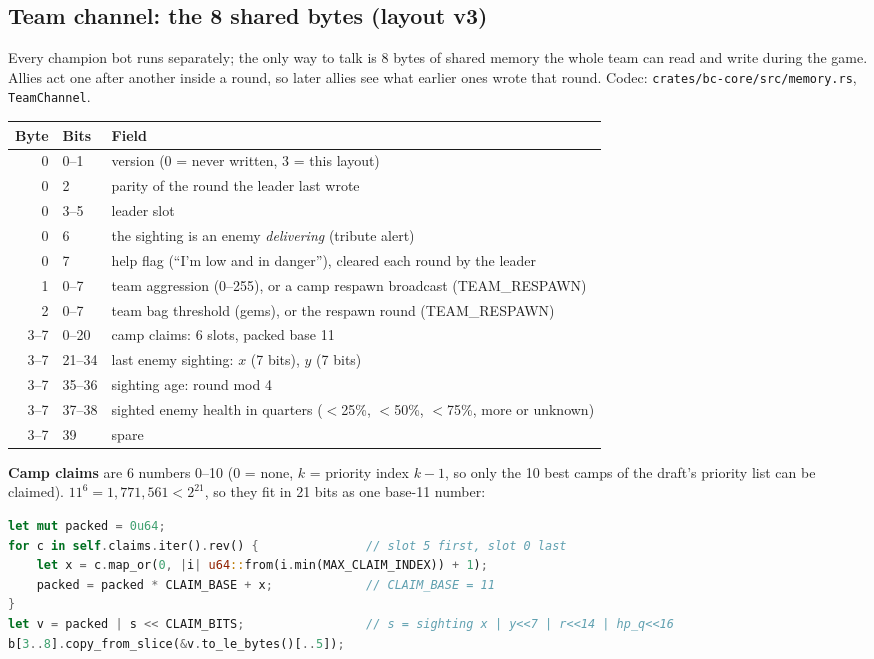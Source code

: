 \documentclass[11pt,a4paper]{article}
\newcommand{\f}[1]{\texttt{#1}}
\begin{document}
\subsection{Team channel: the 8 shared bytes (layout v3)}
Every champion bot runs separately; the only way to talk is 8 bytes of shared memory the whole team can read
and write during the game. Allies act one after another inside a round, so later allies see what earlier
ones wrote that round. Codec: \f{crates/bc-core/src/memory.rs}, \f{TeamChannel}.

\begin{center}\small
\begin{tabular}{@{}rll@{}}
\toprule
Byte & Bits & Field\\
\midrule
0 & 0--1 & version (0 = never written, 3 = this layout)\\
0 & 2 & parity of the round the leader last wrote\\
0 & 3--5 & leader slot\\
0 & 6 & the sighting is an enemy \emph{delivering} (tribute alert)\\
0 & 7 & help flag (``I'm low and in danger''), cleared each round by the leader\\
1 & 0--7 & team aggression (0--255), or a camp respawn broadcast (TEAM\_RESPAWN)\\
2 & 0--7 & team bag threshold (gems), or the respawn round (TEAM\_RESPAWN)\\
3--7 & 0--20 & camp claims: 6 slots, packed base 11\\
3--7 & 21--34 & last enemy sighting: $x$ (7 bits), $y$ (7 bits)\\
3--7 & 35--36 & sighting age: round mod 4\\
3--7 & 37--38 & sighted enemy health in quarters ($<$25\%, $<$50\%, $<$75\%, more or unknown)\\
3--7 & 39 & spare\\
\bottomrule
\end{tabular}
\end{center}

\textbf{Camp claims} are 6 numbers 0--10 (0 = none, $k$ = priority index $k-1$, so only the 10 best camps
of the draft's priority list can be claimed). $11^6 = 1{,}771{,}561 < 2^{21}$, so they fit in 21 bits as
one base-11 number:
\begin{lstlisting}[language=Rust]
let mut packed = 0u64;
for c in self.claims.iter().rev() {               // slot 5 first, slot 0 last
    let x = c.map_or(0, |i| u64::from(i.min(MAX_CLAIM_INDEX)) + 1);
    packed = packed * CLAIM_BASE + x;             // CLAIM_BASE = 11
}
let v = packed | s << CLAIM_BITS;                 // s = sighting x | y<<7 | r<<14 | hp_q<<16
b[3..8].copy_from_slice(&v.to_le_bytes()[..5]);
\end{lstlisting}
\end{document}

